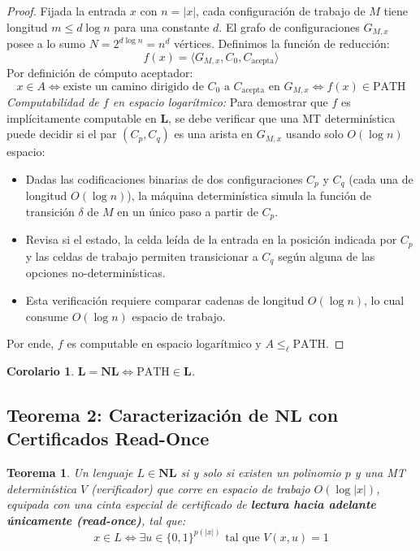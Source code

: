 \documentclass[11pt, a4paper]{article}
\theoremstyle{definition}
\theoremstyle{plain}
\newtheorem{teorema}[definicion]{Teorema}
\newtheorem{corolario}[definicion]{Corolario}
\theoremstyle{remark}
\newcommand{\classL}{\mathbf{L}}
\newcommand{\classNL}{\mathbf{NL}}
\newcommand{\PATH}{\text{PATH}}
\newcommand{\leL}{\le_\ell}
\begin{document}
\begin{proof}
Fijada la entrada $x$ con $n = |x|$, cada configuración de trabajo de $M$ tiene longitud $m \le d \log n$ para una constante $d$. El grafo de configuraciones $G_{M,x}$ posee a lo sumo $N = 2^{d \log n} = n^d$ vértices. Definimos la función de reducción:
\[
f(x) = \langle G_{M,x}, C_0, C_{\text{acepta}} \rangle
\]
Por definición de cómputo aceptador:
\[
x \in A \iff \text{existe un camino dirigido de } C_0 \text{ a } C_{\text{acepta}} \text{ en } G_{M,x} \iff f(x) \in \PATH
\]
\textit{Computabilidad de $f$ en espacio logarítmico:} Para demostrar que $f$ es implícitamente computable en $\classL$, se debe verificar que una MT determinística puede decidir si el par $(C_p, C_q)$ es una arista en $G_{M,x}$ usando solo $O(\log n)$ espacio:
\begin{itemize}
    \item Dadas las codificaciones binarias de dos configuraciones $C_p$ y $C_q$ (cada una de longitud $O(\log n)$), la máquina determinística simula la función de transición $\delta$ de $M$ en un único paso a partir de $C_p$.
    \item Revisa si el estado, la celda leída de la entrada en la posición indicada por $C_p$ y las celdas de trabajo permiten transicionar a $C_q$ según alguna de las opciones no-determinísticas.
    \item Esta verificación requiere comparar cadenas de longitud $O(\log n)$, lo cual consume $O(\log n)$ espacio de trabajo.
\end{itemize}
Por ende, $f$ es computable en espacio logarítmico y $A \leL \PATH$.
\end{proof}

\begin{corolario}
$\classL = \classNL \iff \PATH \in \classL$.
\end{corolario}

\subsection{Teorema 2: Caracterización de \texorpdfstring{$\classNL$}{NL} con Certificados Read-Once}

\begin{teorema}
Un lenguaje $L \in \classNL$ si y solo si existen un polinomio $p$ y una MT determinística $V$ (verificador) que corre en espacio de trabajo $O(\log |x|)$, equipada con una cinta especial de certificado de \textbf{lectura hacia adelante únicamente (\textit{read-once})}, tal que:
\[
x \in L \iff \exists u \in {\{0,1\}}^{p(|x|)} \text{ tal que } V(x, u) = 1
\]
\end{teorema}
\end{document}
